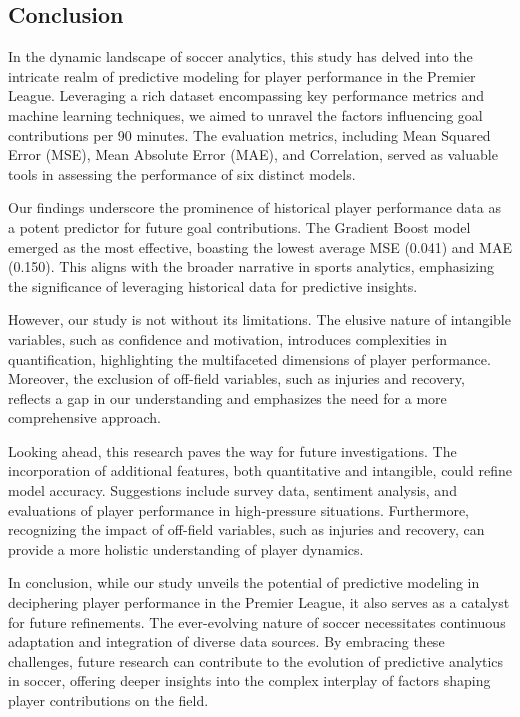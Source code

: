 \documentclass[12pt]{article}
\begin{document}
\subsection{Conclusion}


In the dynamic landscape of soccer analytics, this study has delved into the
intricate realm of predictive modeling for player performance in the Premier League.
Leveraging a rich dataset encompassing key performance metrics and machine
learning techniques, we aimed to unravel the factors influencing goal
contributions per 90 minutes. The evaluation metrics, including Mean Squared Error
(MSE), Mean Absolute Error (MAE), and Correlation, served as valuable tools in
assessing the performance of six distinct models.

Our findings underscore the prominence of historical player performance data as
a potent predictor for future goal contributions. The Gradient Boost model
emerged as the most effective, boasting the lowest average MSE (0.041) and MAE
(0.150). This aligns with the broader narrative in sports analytics, emphasizing
the significance of leveraging historical data for predictive insights.

However, our study is not without its limitations. The elusive nature of
intangible variables, such as confidence and motivation, introduces complexities
in quantification, highlighting the multifaceted dimensions of player performance.
Moreover, the exclusion of off-field variables, such as injuries and recovery,
reflects a gap in our understanding and emphasizes the need for a more
comprehensive approach.

Looking ahead, this research paves the way for future investigations. The
incorporation of additional features, both quantitative and intangible, could
refine model accuracy. Suggestions include survey data, sentiment analysis, and
evaluations of player performance in high-pressure situations. Furthermore,
recognizing the impact of off-field variables, such as injuries and recovery,
can provide a more holistic understanding of player dynamics.

In conclusion, while our study unveils the potential of predictive modeling in
deciphering player performance in the Premier League, it also serves as a
catalyst for future refinements. The ever-evolving nature of soccer necessitates
continuous adaptation and integration of diverse data sources. By embracing
these challenges, future research can contribute to the evolution of predictive
analytics in soccer, offering deeper insights into the complex interplay of
factors shaping player contributions on the field.

















 
\end{document}
